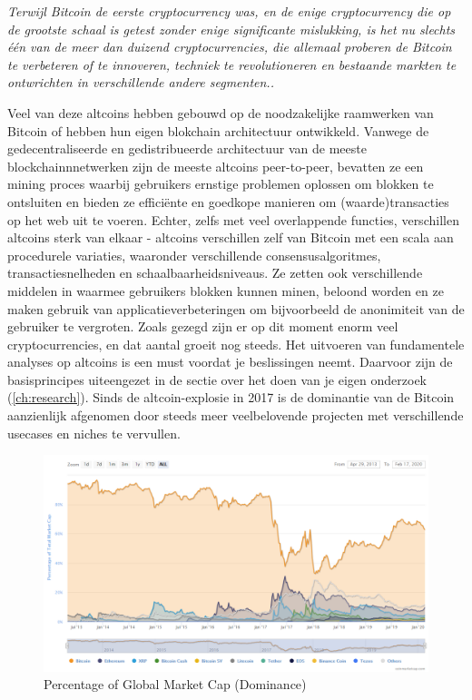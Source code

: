 \medskip
{}
    \begin{tcolorbox}
    [enhanced,
    title=Altcoins,
    frame style=
    {left color=orange!85!black,right color=yellow!95!black}]
       \textit{Terwijl Bitcoin de eerste cryptocurrency was, en de enige cryptocurrency die op de grootste schaal is getest zonder enige significante mislukking, is het nu slechts \'e\'en van de meer dan duizend cryptocurrencies, die allemaal proberen de Bitcoin te verbeteren of te innoveren, techniek te revolutioneren en bestaande markten te ontwrichten in verschillende andere segmenten..}
\end{tcolorbox}
\medskip

Veel van deze altcoins hebben gebouwd op de noodzakelijke raamwerken van Bitcoin of hebben hun eigen blokchain architectuur ontwikkeld. Vanwege de gedecentraliseerde en gedistribueerde architectuur van de meeste blockchainnnetwerken zijn de meeste altcoins peer-to-peer, bevatten ze een mining proces waarbij gebruikers ernstige problemen oplossen om blokken te ontsluiten en bieden ze effici\"ente en goedkope manieren om (waarde)transacties op het web uit te voeren. Echter, zelfs met veel overlappende functies, verschillen altcoins sterk van elkaar - altcoins verschillen zelf van Bitcoin met een scala aan procedurele variaties, waaronder verschillende consensusalgoritmes, transactiesnelheden en schaalbaarheidsniveaus. Ze zetten ook verschillende middelen in waarmee gebruikers blokken kunnen minen, beloond worden en ze maken gebruik van applicatieverbeteringen om bijvoorbeeld de anonimiteit van de gebruiker te vergroten. Zoals gezegd zijn er op dit moment enorm veel cryptocurrencies, en dat aantal groeit nog steeds. Het uitvoeren van fundamentele analyses op altcoins is een must voordat je beslissingen neemt. Daarvoor zijn de basisprincipes uiteengezet in de sectie over het doen van je eigen onderzoek  (\cref{ch:research}). Sinds de altcoin-explosie in 2017 is de dominantie van de Bitcoin aanzienlijk afgenomen door steeds meer veelbelovende projecten met verschillende usecases en niches te vervullen.

\begin{figure}
    \centering
    \includegraphics[width=.95\textwidth]{img/ch-iceage/cmc_domchart_feb2020.PNG}
    \caption{Percentage of Global Market Cap (Dominance)}
    \label{fig:Total market capitalization dominance}
\end{figure} 


